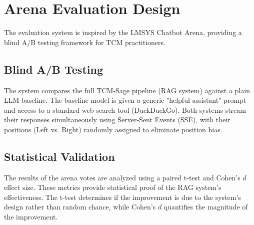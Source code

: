 \section{Arena Evaluation Design}

The evaluation system is inspired by the LMSYS Chatbot Arena, providing a blind A/B testing framework for TCM practitioners.

\subsection{Blind A/B Testing}

The system compares the full TCM-Sage pipeline (RAG system) against a plain LLM baseline. The baseline model is given a generic "helpful assistant" prompt and access to a standard web search tool (DuckDuckGo). Both systems stream their responses simultaneously using Server-Sent Events (SSE), with their positions (Left vs. Right) randomly assigned to eliminate position bias.

\subsection{Statistical Validation}

The results of the arena votes are analyzed using a paired t-test and Cohen's $d$ effect size. These metrics provide statistical proof of the RAG system's effectiveness. The t-test determines if the improvement is due to the system's design rather than random chance, while Cohen's $d$ quantifies the magnitude of the improvement.

